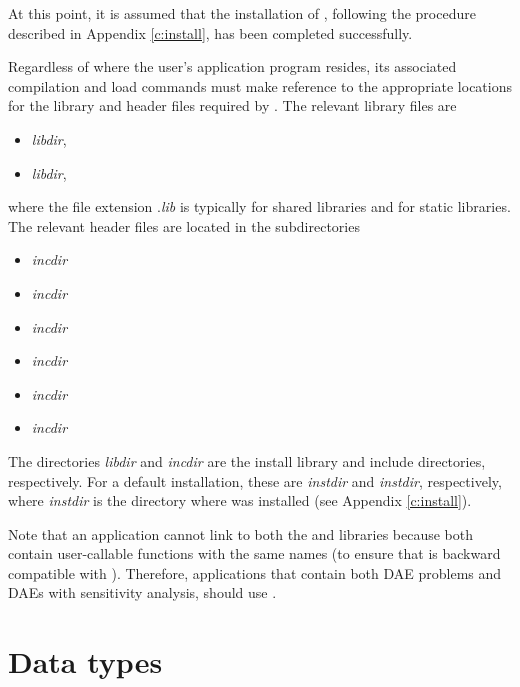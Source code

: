 At this point, it is assumed that the installation of {\idas},
following the procedure described in Appendix \ref{c:install}, has
been completed successfully.

Regardless of where the user's application program resides, its
associated compilation and load commands must make reference to the
appropriate locations for the library and header files required by
{\idas}.  The relevant library files are
\begin{itemize}
\item {\em libdir},
\item {\em libdir},
\end{itemize}
where the file extension .{\em lib} is typically  for shared libraries
and  for static libraries. The relevant header files are located in
the subdirectories
\begin{itemize}
\item {\em incdir}
\item {\em incdir}
\item {\em incdir}
\item {\em incdir}
\item {\em incdir}
\item {\em incdir}
\end{itemize}
The directories {\em libdir} and {\em incdir} are the install library
and include directories, respectively. For a default installation,
these are {\em instdir} and {\em instdir},
respectively, where {\em instdir} is the directory where {\sundials}
was installed (see Appendix \ref{c:install}).

Note that an application cannot link to both the {\ida} and {\idas} libraries
because both contain user-callable functions with the same names (to ensure that {\idas}
is backward compatible with {\ida}). Therefore, applications that contain both
DAE problems and DAEs with sensitivity analysis, should use {\idas}.

\section{Data types}\label{s:types}


